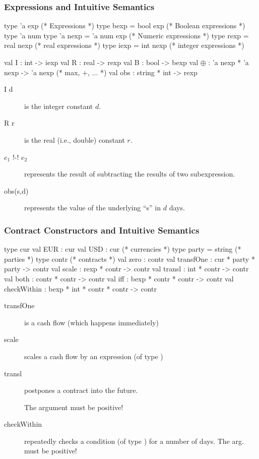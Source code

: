 \documentclass[xcolor=dvipsnames,11pt]{beamer}
\renewcommand{\emph}[1]{\textcolor{structure!90}{#1}}
\begin{document}
\begin{frame}[fragile,t]
    \frametitle{Expressions and Intuitive Semantics}

\begin{mlcode}
  type 'a exp                     (* Expressions          *)
  type bexp = bool exp            (* Boolean expressions  *)
  type 'a num 
  type 'a nexp = 'a num exp       (* Numeric expressions  *)
  type rexp = real nexp           (*  real expressions    *)
  type iexp = int nexp            (*  integer expressions *)
 
  val I   : int -> iexp
  val R   : real -> rexp
  val B   : bool -> bexp
  val $\oplus$  : 'a nexp * 'a nexp -> 'a nexp  (* max, +, ... *)
  val obs : string * int -> rexp
\end{mlcode}

\begin{description}
\item[I d] is the integer constant $d$.
\item[R r] is the real (i.e., double) constant $r$.
\item[$e_1$ !-! $e_2$] represents the result of subtracting the results of two subexpression.
\item[obs(s,d)] represents the value of the underlying ``s'' in $d$ days.
\end{description}

\end{frame}

\begin{frame}[fragile,t]
    \frametitle{Contract Constructors and Intuitive Semantics}

\begin{mlcode}
  type cur val EUR : cur val USD : cur    (* currencies *)
  type party = string                     (* parties *)
  type contr                              (* contracts *)
  val zero        : contr             
  val transfOne   : cur * party * party -> contr
  val scale       : rexp * contr -> contr
  val transl      : int * contr -> contr
  val both        : contr * contr -> contr
  val iff         : bexp * contr * contr -> contr
  val checkWithin : bexp * int * contr * contr -> contr
\end{mlcode}

\begin{description}
\item[transfOne] is a cash flow (which happens immediately)
\item[scale] scales a cash flow by an expression (of type )
\item[transl] postpones a contract into the \emph{future}.

    The  argument must be positive!

\item[checkWithin] repeatedly checks a condition (of type ) for a number of days.
    The  arg. must be positive!
\end{description}
\end{frame}
\end{document}
